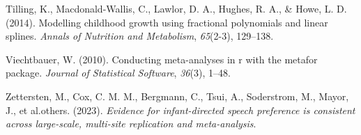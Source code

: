 \documentclass[
  man]{apa6}
\newlength{\cslhangindent}
\newlength{\cslentryspacingunit} %
\newenvironment{CSLReferences}[2] %
 {%
  \setlength{\parindent}{0pt}
  \ifodd #1
  \let\oldpar\par
  \def\par{\hangindent=\cslhangindent\oldpar}
  \fi
  \setlength{\parskip}{#2\cslentryspacingunit}
 }%
 {}
\begin{document}
\begin{CSLReferences}{1}{0}
\leavevmode{}%
Tilling, K., Macdonald-Wallis, C., Lawlor, D. A., Hughes, R. A., \& Howe, L. D. (2014). Modelling childhood growth using fractional polynomials and linear splines. \emph{Annals of Nutrition and Metabolism}, \emph{65}(2-3), 129--138.

\leavevmode{}%
Viechtbauer, W. (2010). Conducting meta-analyses in r with the metafor package. \emph{Journal of Statistical Software}, \emph{36}(3), 1--48.

\leavevmode{}%
Zettersten, M., Cox, C. M. M., Bergmann, C., Tsui, A., Soderstrom, M., Mayor, J., et al.others. (2023). \emph{Evidence for infant-directed speech preference is consistent across large-scale, multi-site replication and meta-analysis}.

\end{CSLReferences}
\end{document}
